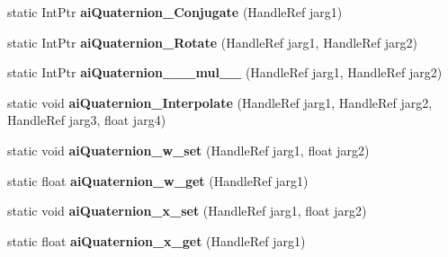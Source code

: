 \begin{DoxyCompactItemize}
\item 
\hypertarget{class_assimp_p_i_n_v_o_k_e_ae13ff4f26b1b129594b16e8977f55d61}{static Int\+Ptr {\bfseries ai\+Quaternion\+\_\+\+Conjugate} (Handle\+Ref jarg1)}\label{class_assimp_p_i_n_v_o_k_e_ae13ff4f26b1b129594b16e8977f55d61}

\item 
\hypertarget{class_assimp_p_i_n_v_o_k_e_a7f752449acc3d44231fa4b8943052c6d}{static Int\+Ptr {\bfseries ai\+Quaternion\+\_\+\+Rotate} (Handle\+Ref jarg1, Handle\+Ref jarg2)}\label{class_assimp_p_i_n_v_o_k_e_a7f752449acc3d44231fa4b8943052c6d}

\item 
\hypertarget{class_assimp_p_i_n_v_o_k_e_aab33fa273e42e519dc382d9d3a2b856a}{static Int\+Ptr {\bfseries ai\+Quaternion\+\_\+\+\_\+\+\_\+mul\+\_\+\+\_\+} (Handle\+Ref jarg1, Handle\+Ref jarg2)}\label{class_assimp_p_i_n_v_o_k_e_aab33fa273e42e519dc382d9d3a2b856a}

\item 
\hypertarget{class_assimp_p_i_n_v_o_k_e_ac4d520e06de09af0585267bf892ad66c}{static void {\bfseries ai\+Quaternion\+\_\+\+Interpolate} (Handle\+Ref jarg1, Handle\+Ref jarg2, Handle\+Ref jarg3, float jarg4)}\label{class_assimp_p_i_n_v_o_k_e_ac4d520e06de09af0585267bf892ad66c}

\item 
\hypertarget{class_assimp_p_i_n_v_o_k_e_a8b2a0a6a31dc236b1409069cca9f6911}{static void {\bfseries ai\+Quaternion\+\_\+w\+\_\+set} (Handle\+Ref jarg1, float jarg2)}\label{class_assimp_p_i_n_v_o_k_e_a8b2a0a6a31dc236b1409069cca9f6911}

\item 
\hypertarget{class_assimp_p_i_n_v_o_k_e_ace27291ec87b5b8f8a424aef78afb90d}{static float {\bfseries ai\+Quaternion\+\_\+w\+\_\+get} (Handle\+Ref jarg1)}\label{class_assimp_p_i_n_v_o_k_e_ace27291ec87b5b8f8a424aef78afb90d}

\item 
\hypertarget{class_assimp_p_i_n_v_o_k_e_a9cd81c27b449030790c17ea08c6801cc}{static void {\bfseries ai\+Quaternion\+\_\+x\+\_\+set} (Handle\+Ref jarg1, float jarg2)}\label{class_assimp_p_i_n_v_o_k_e_a9cd81c27b449030790c17ea08c6801cc}

\item 
\hypertarget{class_assimp_p_i_n_v_o_k_e_a65ebfc33fb6f80340b81aa060c702706}{static float {\bfseries ai\+Quaternion\+\_\+x\+\_\+get} (Handle\+Ref jarg1)}\label{class_assimp_p_i_n_v_o_k_e_a65ebfc33fb6f80340b81aa060c702706}


\end{DoxyCompactItemize}
